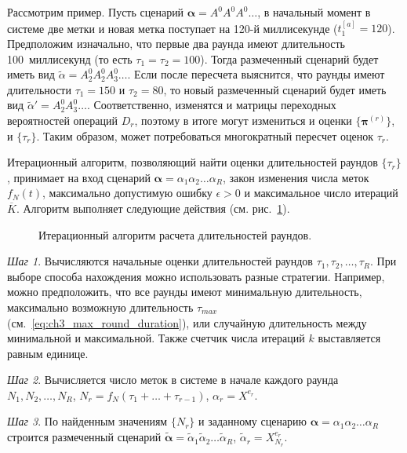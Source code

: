 Рассмотрим пример. Пусть сценарий $\bm{\alpha} = A^0 A^0 A^0 \dots$, в начальный момент в системе две метки и новая метка поступает на 120-й миллисекунде ($t_1^{[a]} = 120$). Предположим изначально, что первые два раунда имеют длительность 100~миллисекунд (то есть $\tau_1 = \tau_2 = 100$). Тогда размеченный сценарий будет иметь вид $\widetilde{\alpha} = A_2^0 A_2^0 A_3^0 \dots$. Если после пересчета выяснится, что раунды имеют длительности $\tau_1 = 150$ и $\tau_2 = 80$, то новый размеченный сценарий будет иметь вид $\widetilde{\alpha}' = A_2^0 A_3^0 \dots$. Соответственно, изменятся и матрицы переходных вероятностей операций $D_r$, поэтому в итоге могут измениться и оценки $\{ \bm{\pi}^{(r)} \}$, и $\{ \tau_r \}$. Таким образом, может потребоваться многократный пересчет оценок $\tau_r$.

Итерационный алгоритм, позволяющий найти оценки длительностей раундов $\{ \tau_r \}$, принимает на вход сценарий $\bm{\alpha} = \alpha_1 \alpha_2 \dots \alpha_R$, закон изменения числа меток $f_N(t)$, максимально допустимую ошибку $\epsilon > 0$ и максимальное число итераций $\overline{K}$. Алгоритм выполняет следующие действия (см. рис.~\ref{fig:ch3_iterative_algorithm}).

\begin{figure}[htb]
  \caption{Итерационный алгоритм расчета длительностей раундов.}
  \label{fig:ch3_iterative_algorithm}
\end{figure}

\textit{Шаг 1}. Вычисляются начальные оценки длительностей раундов $\tau_1, \tau_2, \dots, \tau_R$. При выборе способа нахождения можно использовать разные стратегии. Например, можно предположить, что все раунды имеют минимальную длительность, максимально возможную длительность $\tau_{max}$ (см.~\eqref{eq:ch3_max_round_duration}), или случайную длительность между минимальной и максимальной. Также счетчик числа итераций $k$ выставляется равным единице.

\textit{Шаг 2}. Вычисляется число меток в системе в начале каждого раунда $N_1, N_2, \dots, N_R$, $N_r = f_N(\tau_1 + \dots + \tau_{r-1})$, $\alpha_r = X^{e_r}$.

\textit{Шаг 3}. По найденным значениям $\{ N_r \}$ и заданному сценарию $\bm{\alpha} = \alpha_1 \alpha_2 \dots \alpha_R$ строится размеченный сценарий $\widetilde{\bm{\alpha}} = \widetilde{\alpha}_1 \widetilde{\alpha}_2 \dots \widetilde{\alpha}_R$, $\widetilde{\alpha}_r = X_{N_r}^{e_r}$.

